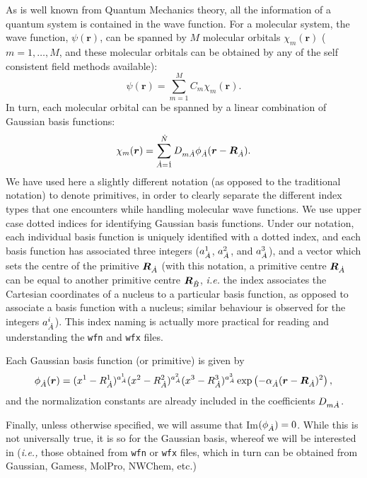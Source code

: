 As is well known from Quantum Mechanics theory, all the information of a quantum system is
contained in the wave function. For a molecular system,  the wave function, $\psi(\boldsymbol{r})$,
can be spanned by $M$ molecular orbitals $\chi_m(\boldsymbol{r})$ ($m=1,\dots,M$, and these
molecular orbitals can be obtained by any of the self consistent field methods available):
%
\begin{equation}
   \psi(\boldsymbol{r})=\sum_{m=1}^{M}C_m\chi_m(\boldsymbol{r}).
\end{equation}
%
In turn, each molecular orbital can be spanned by a linear combination of Gaussian basis functions:
\begin{equation}
   \chi_m(\boldsymbol{r})=\sum_{\dot{A}=\dot{1}}^{\dot{N}}D_{m\dot{A}}\phi_{\dot{A}}(\boldsymbol{r}-\boldsymbol{R}_{\dot{A}}).
\end{equation}
%
We have used here a slightly different notation (as opposed to the traditional notation) to denote
primitives, in order to clearly separate the different index types that one encounters while handling
molecular wave functions. We use upper case dotted indices for identifying Gaussian basis functions.
Under our notation, each individual basis function is uniquely identified with a dotted index, and
each basis function has associated three integers ($a^1_{\dot{A}}$, $a^2_{\dot{A}}$, and $a^3_{\dot{A}}$), and a
vector which sets the centre of the primitive $\boldsymbol{R}_{\dot{A}}$ (with this notation, a
primitive centre $\boldsymbol{R}_{\dot{A}}$ can be equal to another primitive centre
$\boldsymbol{R}_{\dot{B}}$, \textit{i.e.} the index associates the Cartesian coordinates of a nucleus
to a particular basis function, as opposed to associate a basis function with a nucleus;
similar behaviour is observed for the integers $a^i_{\dot{A}}$). This index naming is actually more
practical for reading and understanding the \texttt{wfn} and \texttt{wfx} files. 

Each Gaussian basis function (or primitive) is given by
%
\begin{equation}\label{eq:primitivedef}
   \phi_{\dot{A}}(\boldsymbol{r})=(x^1-R^1_{\dot{A}})^{a^1_{\dot{A}}}(x^2-R^2_{\dot{A}})^{a^2_{\dot{A}}}(x^3-R^3_{\dot{A}})^{a^3_{\dot{A}}}
   \exp\left(-\alpha_{\dot{A}}(\boldsymbol{r}-\boldsymbol{R}_{\dot{A}})^2\right),
\end{equation}
%
and the normalization constants are already included in the coefficients $D_{m\dot{A}}$.

Finally, unless otherwise specified, we will assume that Im$(\phi_{\dot{A}})=0$. While this is not universally true,
it is so for the Gaussian basis, whereof we will be interested in (\textit{i.e.,} those obtained from \texttt{wfn} or \texttt{wfx} files, which in turn can be obtained from Gaussian, Gamess, MolPro, NWChem, etc.)


